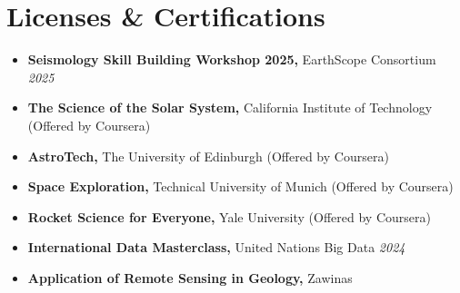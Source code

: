 \documentclass[letterpaper,11pt]{article}
\begin{document}
	\section{Licenses \& Certifications}
						\vspace{-0.7em}
	\begin{itemize}[left=0pt, label={}, topsep=7.5pt, partopsep=0pt, itemsep=6pt, parsep=0pt]
	\item \textbf{Seismology Skill Building Workshop 2025,} EarthScope Consortium \hfill \textit{2025}
\end{itemize}
\vspace{-1.2em}
	\begin{itemize}[left=0pt, label={}, topsep=7.5pt, partopsep=0pt, itemsep=6pt, parsep=0pt]
	\item \textbf{The Science of the Solar System,} California Institute of Technology (Offered by Coursera)
\end{itemize}
\vspace{-1.2em}
\begin{itemize}[left=0pt, label={}, topsep=7.5pt, partopsep=0pt, itemsep=6pt, parsep=0pt]
	\item \textbf{AstroTech,} The University of Edinburgh (Offered by Coursera)
\end{itemize}
\vspace{-1.2em}
\begin{itemize}[left=0pt, label={}, topsep=7.5pt, partopsep=0pt, itemsep=6pt, parsep=0pt]
	\item \textbf{Space Exploration,} Technical University of Munich (Offered by Coursera)
\end{itemize}
\vspace{-1.2em}
\begin{itemize}[left=0pt, label={}, topsep=7.5pt, partopsep=0pt, itemsep=6pt, parsep=0pt]
	\item \textbf{Rocket Science for Everyone,} Yale University (Offered by Coursera)
\end{itemize}
\vspace{-1.2em}
	\begin{itemize}[left=0pt, label={}, topsep=7.5pt, partopsep=0pt, itemsep=6pt, parsep=0pt]
		\item \textbf{International Data Masterclass,} United Nations Big Data  \hfill \textit{2024}
	\end{itemize}
	\vspace{-1.2em} 
	\begin{itemize}[left=0pt, label={}, topsep=7.5pt, partopsep=0pt, itemsep=6pt, parsep=0pt]
		\item \textbf{Application of Remote Sensing in Geology,} Zawinas
	\end{itemize}
\end{document}
